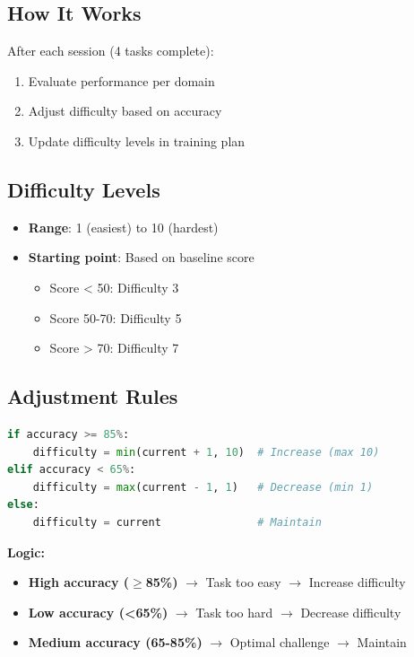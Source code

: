 \documentclass[12pt,a4paper]{article}
\begin{document}
\subsection{How It Works}

After each session (4 tasks complete):
\begin{enumerate}
    \item Evaluate performance per domain
    \item Adjust difficulty based on accuracy
    \item Update difficulty levels in training plan
\end{enumerate}

\subsection{Difficulty Levels}

\begin{itemize}
    \item \textbf{Range}: 1 (easiest) to 10 (hardest)
    \item \textbf{Starting point}: Based on baseline score
    \begin{itemize}
        \item Score < 50: Difficulty 3
        \item Score 50-70: Difficulty 5
        \item Score > 70: Difficulty 7
    \end{itemize}
\end{itemize}

\subsection{Adjustment Rules}

\begin{lstlisting}[language=Python]
if accuracy >= 85%:
    difficulty = min(current + 1, 10)  # Increase (max 10)
elif accuracy < 65%:
    difficulty = max(current - 1, 1)   # Decrease (min 1)
else:
    difficulty = current               # Maintain
\end{lstlisting}

\textbf{Logic:}
\begin{itemize}
    \item \textbf{High accuracy ($\geq$85\%)} $\rightarrow$ Task too easy $\rightarrow$ Increase difficulty
    \item \textbf{Low accuracy (<65\%)} $\rightarrow$ Task too hard $\rightarrow$ Decrease difficulty
    \item \textbf{Medium accuracy (65-85\%)} $\rightarrow$ Optimal challenge $\rightarrow$ Maintain
\end{itemize}
\end{document}
